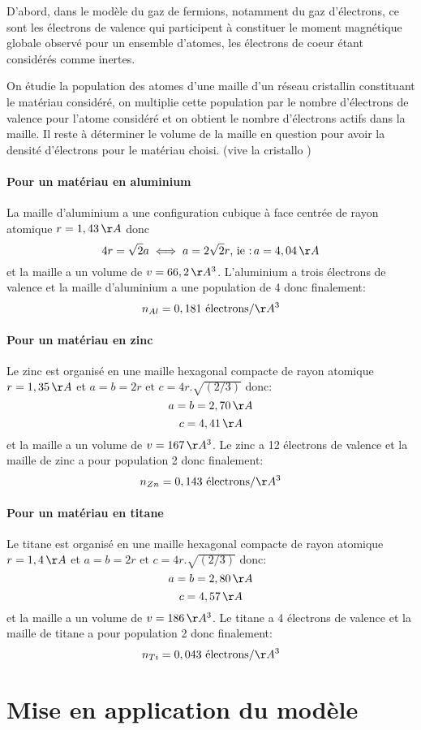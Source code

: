 D'abord, dans le modèle du gaz de fermions, notamment du gaz d'électrons, ce sont les électrons de valence qui participent à constituer le moment magnétique globale observé pour un ensemble d'atomes, les électrons de coeur étant considérés comme inertes.

On étudie la population des atomes d'une maille d'un réseau cristallin constituant le matériau considéré, on multiplie cette population par le nombre d'électrons de valence pour l'atome considéré et on obtient le nombre d'électrons actifs dans la maille. Il reste à déterminer le volume de la maille en question pour avoir la densité d'électrons pour le matériau choisi. (vive la cristallo \smiley{})
\subsubsection{Pour un matériau en aluminium}

La maille d'aluminium a une configuration cubique à face centrée de rayon atomique $r=1,43\,\AA$ donc $$4r=\sqrt{2}a \iff a = 2\sqrt{2}r \mbox{, ie :} \, a = 4,04\,\AA$$
et la maille a un volume de $v = 66,2 \,\AA^3$. L'aluminium a trois électrons de valence et la maille d'aluminium a une population de 4 donc finalement:
$$n_{Al} = 0,181 \text{ électrons} / \AA^3$$

\subsubsection{Pour un matériau en zinc}
Le zinc est organisé en une maille hexagonal compacte de rayon atomique $r=1,35 \,\AA$ et $a = b = 2r \mbox{ et }c = 4r.\sqrt{(2 / 3)}$ donc:
$$a=b=2,70\,\AA$$
$$c=4,41\,\AA$$
et la maille a un volume de $v = 167\,\AA^3$. Le zinc a 12 électrons de valence et la maille de zinc a pour population 2 donc finalement:
$$n_{Zn} = 0,143 \text{ électrons} / \AA^3$$
\subsubsection{Pour un matériau en titane}
Le titane est organisé en une maille hexagonal compacte de rayon atomique $r=1,4 \,\AA$ et $a = b = 2r \mbox{ et }c = 4r.\sqrt{(2 / 3)}$ donc:
$$a=b=2,80\,\AA$$
$$c=4,57\,\AA$$
et la maille a un volume de $v = 186\,\AA^3$. Le titane a 4 électrons de valence et la maille de titane a pour population 2 donc finalement:
$$n_{Ti} = 0,043 \text{ électrons} / \AA^3$$

\chapter{Mise en application du modèle}
